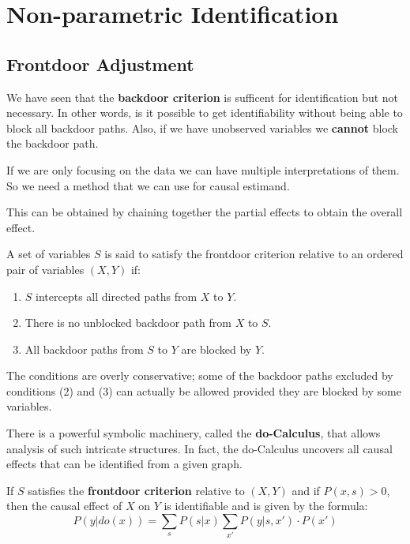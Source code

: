 \chapter{Non-parametric Identification}
\section{Frontdoor Adjustment}
We have seen that the \textbf{backdoor criterion} is sufficent for identification but not 
necessary. In other words, is it possible to get identifiability without being able to 
block all backdoor paths. Also, if we have unobserved variables we \textbf{cannot} block 
the backdoor path.

If we are only focusing on the data we can have multiple  interpretations of them. So we need 
a method that we can use for causal estimand.

This can be obtained by chaining together the partial effects to obtain the overall effect. 
\begin{definition}
    A set of variables $S$ is said to satisfy the frontdoor criterion relative to an
    ordered pair of variables $(X, Y)$ if:
    \begin{enumerate}
        \item $S$ intercepts all directed paths from $X$ to $Y$.
        \item There is no unblocked backdoor path from $X$ to $S$.
        \item All backdoor paths from $S$ to $Y$ are blocked by $Y$.
    \end{enumerate}
\end{definition}
The conditions are overly conservative; some of the backdoor paths excluded by conditions 
(2) and (3) can actually be allowed provided they are blocked by some variables.

There is a powerful symbolic machinery, called the \textbf{do-Calculus}, that allows 
analysis of such intricate structures. In fact, the do-Calculus uncovers all causal 
effects that can be identified from a given graph.

\begin{definition}
    If $S$ satisfies the \textbf{frontdoor criterion} relative to $(X, Y)$ and if $P(x, s) > 0$,
    then the causal effect of $X$ on $Y$ is identifiable and is given by the formula:
    \begin{equation}
        P(y | do(x)) = \sum_{s} P(s | x) \sum_{x'} P(y | s, x') \cdot P(x')
    \end{equation}
\end{definition}


